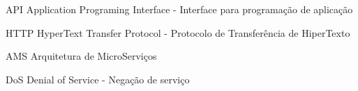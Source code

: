 
\begin{siglas}
	\item[API]{Application Programing Interface - Interface para programação de aplicação}
	\item[HTTP]{HyperText Transfer Protocol - Protocolo de Transferência de HiperTexto}
	\item[AMS]{Arquitetura de MicroServiços}
	\item[DoS]{Denial of Service - Negação de serviço}
\end{siglas}